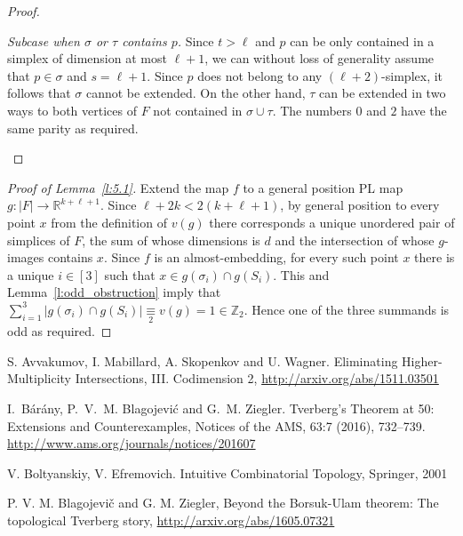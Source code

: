 \documentclass[runningheads]{llncs}
\theoremstyle{remark}
\theoremstyle{definition}
\newcommand{\R}{\mathbb{R}}
\newcommand{\Z}{\mathbb{Z}}
\begin{document}
{\begin{proof}
\begin{itemize}
{\it Subcase when $\sigma$ or $\tau$ contains $p$.} Since $t>\ell$ and $p$ can be only contained in a simplex of dimension at most $\ell + 1$, we can without loss of generality assume that $p\in\sigma$ and $s= \ell + 1$.
Since $p$ does not belong to any $(\ell +2)$-simplex, it follows that $\sigma$ cannot be extended.
On the other hand, $\tau$ can be extended in two ways to both vertices of $F$ not contained in $\sigma\cup\tau$.
The numbers $0$ and $2$ have the same parity as required.
\end{itemize}
\end{proof}


\begin{proof}[Proof of Lemma~\ref{l:5.1}]
Extend the map $f$ to a general position PL map $g\colon |F| \to \R^{k+\ell+1}$.
Since $\ell+2k<2(k+\ell+1)$, by general position to every point $x$ from the definition of $v(g)$ there corresponds a unique unordered pair of simplices of $F$, the sum of whose dimensions is $d$ and the intersection of whose $g$-images contains $x$.
Since $f$ is an almost-embedding, for every such point $x$ there is a unique $i\in[3]$ such that
$x\in g(\sigma_i)\cap g(S_i)$.
This and Lemma~\ref{l:odd_obstruction} imply that
$\sum_{i=1}^3|g(\sigma_i)\cap g(S_i)|\underset2\equiv v(g)=1\in\Z_2$.
Hence one of the three summands is odd as required.
\end{proof}







\iffalse
\begin{thebibliography}{99}

  S. Avvakumov, I. Mabillard, A. Skopenkov and U. Wagner.
  \newblock Eliminating Higher-Multiplicity Intersections, III. Codimension 2,
\linebreak
  \url{http://arxiv.org/abs/1511.03501}

I.~B{{\'a}}r{{\'a}}ny, P.~V.~M. Blagojevi{{\'c}} and G.~M. Ziegler.
Tverberg's Theorem at 50: Extensions and Counterexamples, Notices of the AMS, 63:7 (2016), 732--739.
\url{http://www.ams.org/journals/notices/201607}


  V. Boltyanskiy, V. Efremovich. Intuitive Combinatorial Topology, Springer,
    2001

P. V. M. Blagojevi\v c and G. M. Ziegler,
Beyond the Borsuk-Ulam theorem: The topological Tverberg story,
\url{http://arxiv.org/abs/1605.07321}



\end{thebibliography}}
\end{document}
